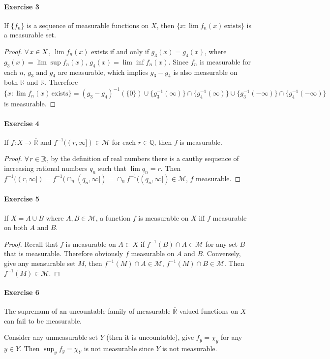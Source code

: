 \paragraph{Exercise 3}
If $\{f_n\}$ is a sequence of measurable functions on $X$, then $\{x:\lim f_n(x)\,\mathrm{exists}\}$ is a measurable set.
\begin{proof}
    $\forall\, x\in X$, $\lim f_n(x)$ exists if and only if $g_3(x)=g_4(x)$, where $g_3(x)=\lim\sup f_n(x)$, $g_4(x)=\lim\inf f_n(x)$. Since $f_n$ is measurable for each $n$, $g_3$ and $g_4$ are measurable, which implies $g_3-g_4$ is also measurable on both $\mathbb{R}$ and $\overline{\mathbb{R}}$. Therefore $\{x:\lim f_n(x)\,\mathrm{exists}\}=(g_3-g_4)^{-1}(\{0\})\cup\{g_3^{-1}(\infty)\}\cap\{g_4^{-1}(\infty)\}\cup\{g_3^{-1}(-\infty)\}\cap\{g_4^{-1}(-\infty)\}$ is measurable.
\end{proof}
\paragraph{Exercise 4}
If $f:X\to\overline{\mathbb{R}}$ and $f^{-1}((r,\infty])\in\mathcal{M}$ for each $r\in\mathbb{Q}$, then $f$ is measurable.
\begin{proof}
    $\forall\, r\in\mathbb{R}$, by the definition of real numbers there is a cauthy sequence of increasing rational numbers $q_n$ such that $\lim q_n=r$. Then $f^{-1}((r,\infty])=f^{-1}(\cap_n(q_n,\infty])=\cap_n f^{-1}((q_n,\infty])\in\mathcal{M}$, $f$ measurable.
\end{proof}
\paragraph{Exercise 5}
If $X=A\cup B$ where $A,B\in\mathcal{M}$, a function $f$ is measurable on $X$ iff $f$ measurable on both $A$ and $B$.
\begin{proof}
    Recall that $f$ is measurable on $A\subset X$ if $f^{-1}(B)\cap A\in\mathcal{M}$ for any set $B$ that is measurable. Therefore obviously $f$ measurable on $A$ and $B$. Conversely, give any measurable set $M$, then $f^{-1}(M)\cap A\in\mathcal{M}$, $f^{-1}(M)\cap B\in\mathcal{M}$. Then $f^{-1}(M)\in\mathcal{M}$.
\end{proof}
\paragraph{Exercise 6}
The supremum of an uncountable family of measurable $\overline{\mathbb{R}}$-valued functions on $X$ can fail to be measurable.
\begin{solution}
    Consider any unmeasurable set $Y$ (then it is uncountable), give $f_y=\chi_y$ for any $y\in Y$. Then $\sup_y f_y=\chi_Y$ is not measurable since $Y$ is not measurable.
\end{solution}

